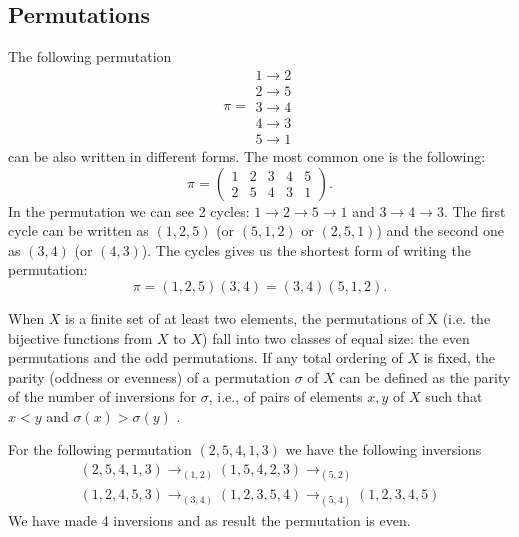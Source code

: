 \begin{appendices}
\section{Permutations}

\begin{example}[Permutation]
  The following permutation
  \[ \pi = 
    \begin{array}{c}
    1 \to 2 \\
    2 \to 5 \\
    3 \to 4 \\
    4 \to 3 \\
    5 \to 1 
    \end{array}
    \]
    can be also written in different forms. The most common one is the following:
    \[
    \pi = \begin{pmatrix}
      1 & 2 & 3 & 4 & 5 \\
      2 & 5 & 4 & 3 & 1
    \end{pmatrix}.
    \]
    In the permutation we can see 2 cycles:
    $1 \to 2 \to 5 \to 1$ and $3 \to 4 \to 3$. The first cycle can be
    written as $(1,2,5)$ (or $(5,1,2)$ or $(2,5,1)$) and the second
    one as $(3,4)$ (or $(4,3)$). The cycles gives us the shortest form
    of writing the permutation:
    \[
    \pi = (1,2,5)(3,4) = (3,4)(5,1,2).
    \]
  \label{ex:permutation}
\end{example}

\begin{definition}
  When $X$ is a finite set of at least two elements, the permutations of
  X (i.e. the bijective functions from $X$ to $X$) fall into two classes
  of equal size: the even permutations and the odd permutations. If
  any total ordering of $X$ is fixed, the parity (oddness or evenness)
  of a permutation $\sigma$ of $X$ can be defined as the
  parity of the number of inversions for $\sigma$, i.e., of pairs of elements
  $x, y$ of $X$ such that $x < y$ and $\sigma (x) > \sigma (y)$
  \cite{wiki:paritypermutation}.
  \label{def:paritypermutation}
\end{definition}

\begin{example}
  For the following permutation $(2,5,4,1,3)$ we have the following
  inversions
  \begin{eqnarray}
    (2,5,4,1,3) \to_{(1,2)}
    (1,5,4,2,3) \to_{(5,2)}
    \nonumber \\
    (1,2,4,5,3) \to_{(3,4)}
    (1,2,3,5,4) \to_{(5,4)}
    (1,2,3,4,5)
    \nonumber
  \end{eqnarray}
  We have made 4 inversions and as result the permutation is even.
  \label{ex:paritypermutation}
\end{example}


\end{appendices}
